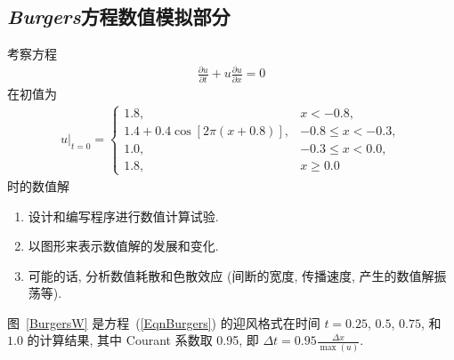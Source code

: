 \documentclass[10.5pt
]{article}
\begin{document}
\subsection{\textit{Burgers}方程数值模拟部分}
考察方程
\begin{align}
\frac{\partial u}{\partial t} + u \frac{\partial u}{\partial x} = 0
\end{align}
在初值为
\begin{align}
u|_{t=0} = \left\{\begin{array}{ll} 1.8, & x < -0.8,
\\
1.4 + 0.4 \cos\left[2 \pi (x + 0.8) \right], & -0.8 \le x < -0.3,
\\
1.0, & -0.3 \le x < 0.0,
\\
1.8, & x \ge 0.0
\end{array} \right.
\end{align}
时的数值解
\begin{enumerate}
\item
  设计和编写程序进行数值计算试验.
\item
  以图形来表示数值解的发展和变化.
\item
  可能的话, 分析数值耗散和色散效应 (间断的宽度, 传播速度, 产生的数值解振荡等).
\end{enumerate}

图~\ref{BurgersW} 是方程~(\ref{EqnBurgers}) 的迎风格式在时间 $t = 0.25$, $0.5$, $0.75$, 和 $1.0$ 的计算结果, 其中 Courant 系数取 0.95,
即 $\Delta t = 0.95 \frac{\Delta x}{\max(u)}$.
\end{document}
